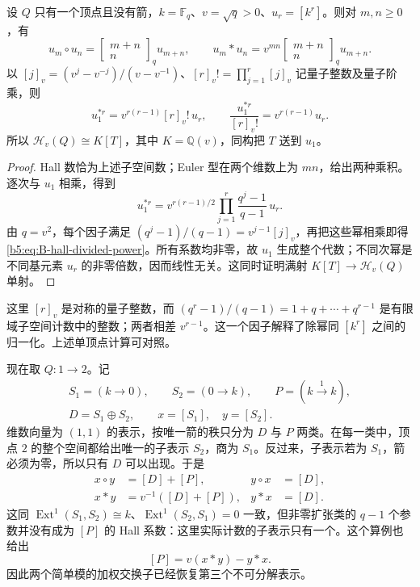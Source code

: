 \begin{proposition}\label{b5:prop:B-hall-one-vertex}
	设 \(Q\) 只有一个顶点且没有箭，\(k=\mathbb F_q\)、\(v=\sqrt q>0\)、\(u_r=[k^r]\)。则对 \(m,n\ge0\)，有
	\[
		u_m\circ u_n=\begin{bmatrix}m+n\\n\end{bmatrix}_q u_{m+n},
		\qquad
		u_m*u_n=v^{mn}\begin{bmatrix}m+n\\n\end{bmatrix}_q u_{m+n}.
	\]
	以 \([j]_v=(v^j-v^{-j})/(v-v^{-1})\)、\([r]_v!=\prod_{j=1}^{r}[j]_v\) 记量子整数及量子阶乘，则
	\begin{equation}\label{b5:eq:B-hall-divided-power}
		u_1^{*r}=v^{r(r-1)}[r]_v!\,u_r,
		\qquad \frac{u_1^{*r}}{[r]_v!}=v^{r(r-1)}u_r.
	\end{equation}
	所以 \(\mathcal H_v(Q)\cong K[T]\)，其中 \(K=\mathbb Q(v)\)，同构把 \(T\) 送到 \(u_1\)。
\end{proposition}
\begin{proof}
	Hall 数恰为上述子空间数；Euler 型在两个维数上为 \(mn\)，给出两种乘积。逐次与 \(u_1\) 相乘，得到
	\[
		u_1^{*r}=v^{r(r-1)/2}
		\prod_{j=1}^{r}\frac{q^j-1}{q-1}\,u_r.
	\]
	由 \(q=v^2\)，每个因子满足 \((q^j-1)/(q-1)=v^{j-1}[j]_v\)，再把这些幂相乘即得\eqref{b5:eq:B-hall-divided-power}。所有系数均非零，故 \(u_1\) 生成整个代数；不同次幂是不同基元素 \(u_r\) 的非零倍数，因而线性无关。这同时证明满射 \(K[T]\to\mathcal H_v(Q)\) 单射。
\end{proof}
这里 \([r]_v\) 是对称的量子整数，而 \((q^r-1)/(q-1)=1+q+\cdots+q^{r-1}\) 是有限域子空间计数中的整数；两者相差 \(v^{r-1}\)。这一个因子解释了除幂同 \([k^r]\) 之间的归一化。上述单顶点计算可对照\cite[作者公开稿, Section 3.3, Example 3.14]{Schiffmann2012HallAlgebras}。

\ProseParagraphBreak
现在取 \(Q:1\to2\)。记
\[
	\begin{gathered}
		S_1=(k\to0),\qquad S_2=(0\to k),\qquad P=(k\xrightarrow{1}k),\\
		D=S_1\oplus S_2,\qquad x=[S_1],\quad y=[S_2].
	\end{gathered}
\]
维数向量为 \((1,1)\) 的表示，按唯一箭的秩只分为 \(D\) 与 \(P\) 两类。在每一类中，顶点 \(2\) 的整个空间都给出唯一的子表示 \(S_2\)，商为 \(S_1\)。反过来，子表示若为 \(S_1\)，箭必须为零，所以只有 \(D\) 可以出现。于是
\begin{equation}\label{b5:eq:B-hall-a2-product}
	\begin{aligned}
	 x\circ y&=[D]+[P],& y\circ x&=[D],\\
	 x*y&=v^{-1}([D]+[P]),& y*x&=[D].
	\end{aligned}
\end{equation}
这同 \(\operatorname{Ext}^1(S_1,S_2)\cong k\)、\(\operatorname{Ext}^1(S_2,S_1)=0\) 一致，但非零扩张类的 \(q-1\) 个参数并没有成为 \([P]\) 的 Hall 系数：这里实际计数的子表示只有一个。这个算例也给出
\[
	[P]=v(x*y)-y*x.
\]
因此两个简单模的加权交换子已经恢复第三个不可分解表示。

